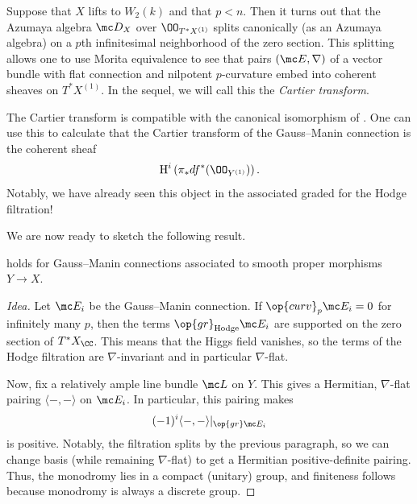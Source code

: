 \documentclass[../notes.tex]{subfiles}
\begin{document}
\begin{definition}
	Suppose that $X$ lifts to $W_2(k)$ and that $p<n$. Then it turns out that the Azumaya algebra $\mc D_X$ over $\OO_{T^*X^{(1)}}$ splits canonically (as an Azumaya algebra) on a $p$th infinitesimal neighborhood of the zero section. This splitting allows one to use Morita equivalence to see that pairs $(\mc E,\nabla)$ of a vector bundle with flat connection and nilpotent $p$-curvature embed into coherent sheaves on $T^*X^{(1)}$.  In the sequel, we will call this the \textit{Cartier transform}.
\end{definition}
\begin{remark}
	The Cartier transform is compatible with the canonical isomorphism of . One can use this to calculate that the Cartier transform of the Gauss--Manin connection is the coherent sheaf
	\[\mathrm H^i\left(\pi_*df^*(\OO_{Y^{(1)}})\right).\]
	Notably, we have already seen this object in the associated graded for the Hodge filtration!
\end{remark}
We are now ready to sketch the following result.
\begin{theorem}[Katz] \label{thm:katz-p-curv}
	 holds for Gauss--Manin connections associated to smooth proper morphisms $Y\to X$.
\end{theorem}
\begin{proof}[Idea]
	Let $\mc E_i$ be the Gauss--Manin connection. If $\op{curv}_p\mc E_i=0$ for infinitely many $p$, then the terms $\op{gr}_{\mathrm{Hodge}}\mc E_i$ are supported on the zero section of $T^*X_\CC$. This means that the Higgs field vanishes, so the terms of the Hodge filtration are $\nabla$-invariant and in particular $\nabla$-flat.

	Now, fix a relatively ample line bundle $\mc L$ on $Y$. This gives a Hermitian, $\nabla$-flat pairing $\langle-,-\rangle$ on $\mc E_i$. In particular, this pairing makes
	\[(-1)^i\langle-,-\rangle|_{\op{gr}\mc E_i}\]
	is positive. Notably, the filtration splits by the previous paragraph, so we can change basis (while remaining $\nabla$-flat) to get a Hermitian positive-definite pairing. Thus, the monodromy lies in a compact (unitary) group, and finiteness follows because monodromy is always a discrete group.
\end{proof}
\end{document}
